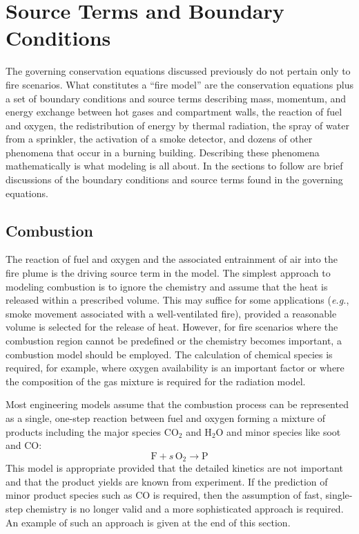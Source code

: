 \documentclass[graybox]{svmult}
\begin{document}
\section{Source Terms and Boundary Conditions}

The governing conservation equations discussed previously do not pertain only to fire scenarios. What constitutes a ``fire model'' are the conservation equations plus a set of boundary conditions and source terms describing mass, momentum, and energy exchange between hot gases and compartment walls, the reaction of fuel and oxygen, the redistribution of energy by thermal radiation, the spray of water from a sprinkler, the activation of a smoke detector, and dozens of other phenomena that occur in a burning building. Describing these phenomena mathematically is what modeling is all about. In the sections to follow are brief discussions of the boundary conditions and source terms found in the governing equations.

\subsection{Combustion}

The reaction of fuel and oxygen and the associated entrainment of air into the fire plume is the driving source term in the model. The simplest approach to modeling combustion is to ignore the chemistry and assume that the heat is released within a prescribed volume. This may suffice for some applications ({\em e.g.}, smoke movement associated with a well-ventilated fire), provided a reasonable volume is selected for the release of heat. However, for fire scenarios where the combustion region cannot be predefined or the chemistry becomes important, a combustion model should be employed. The calculation of chemical species is required, for example, where oxygen availability is an important factor or where the composition of the gas mixture is required for the radiation model.

Most engineering models assume that the combustion process can be represented as a single, one-step reaction between fuel and oxygen forming a mixture of products including the major species CO$_2$ and H$_2$O and minor species like soot and CO:
\begin{equation}
\mathrm{F} + s \, \mathrm{O_2} \rightarrow \mathrm{P}
\label{eq:simplereac}
\end{equation}
This model is appropriate provided that the detailed kinetics are not important and that the product yields are known from experiment. If the prediction of minor product species such as CO is required, then the assumption of fast, single-step chemistry is no longer valid and a more sophisticated approach is required. An example of such an approach is given at the end of this section.
\end{document}

